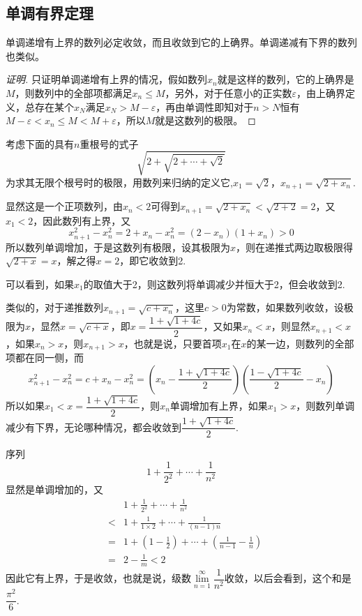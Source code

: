 \subsection{单调有界定理}
\label{sec:theorem-of-monotone-bounded}

\begin{theorem}
  单调递增有上界的数列必定收敛，而且收敛到它的上确界。单调递减有下界的数列也类似。
\end{theorem}

\begin{proof}[证明]
  只证明单调递增有上界的情况，假如数列$x_n$就是这样的数列，它的上确界是$M$，则数列中的全部项都满足$x_n \leqslant M$，另外，对于任意小的正实数$\varepsilon$，由上确界定义，总存在某个$x_N$满足$x_N>M-\varepsilon$，再由单调性即知对于$n>N$恒有$M-\varepsilon < x_n \leqslant M < M+\varepsilon$，所以$M$就是这数列的极限。
\end{proof}

\begin{example}
  考虑下面的具有$n$重根号的式子
  \[ \sqrt{2+\sqrt{2+\cdots+\sqrt{2}}} \]
  为求其无限个根号时的极限，用数列来归纳的定义它,$x_1=\sqrt{2}$，$x_{n+1}=\sqrt{2+x_n}$.

  显然这是一个正项数列，由$x_n<2$可得到$x_{n+1}=\sqrt{2+x_n}<\sqrt{2+2}=2$，又$x_1<2$，因此数列有上界，又
  \[ x_{n+1}^2-x_n^2=2+x_n-x_n^2=(2-x_n)(1+x_n)>0 \]
  所以数列单调增加，于是这数列有极限，设其极限为$x$，则在递推式两边取极限得$\sqrt{2+x}=x$，解之得$x=2$，即它收敛到2.

  可以看到，如果$x_1$的取值大于2，则这数列将单调减少并恒大于2，但会收敛到2.

  类似的，对于递推数列$x_{n+1}=\sqrt{c+x_n}$，这里$c>0$为常数，如果数列收敛，设极限为$x$，显然$x=\sqrt{c+x}$，即$x=\dfrac{1+\sqrt{1+4c}}{2}$，又如果$x_n<x$，则显然$x_{n+1}<x$，如果$x_n>x$，则$x_{n+1}>x$，也就是说，只要首项$x_1$在$x$的某一边，则数列的全部项都在同一侧，而
  \[ x_{n+1}^2-x_n^2=c+x_n-x_n^2=\left( x_n - \frac{1+\sqrt{1+4c}}{2} \right)\left( \frac{1-\sqrt{1+4c}}{2}-x_n \right) \]
  所以如果$x_1<x=\dfrac{1+\sqrt{1+4c}}{2}$，则$x_n$单调增加有上界，如果$x_1>x$，则数列单调减少有下界，无论哪种情况，都会收敛到$\dfrac{1+\sqrt{1+4c}}{2}$.
\end{example}

\begin{example}
  序列
  \[ 1+\frac{1}{2^2}+\cdots+\frac{1}{n^2} \]
  显然是单调增加的，又
  \begin{eqnarray*}
    && 1+\frac{1}{2^2}+\cdots+\frac{1}{n^2} \\
    & < & 1 + \frac{1}{1\times 2}+\cdots+\frac{1}{(n-1)n} \\
    & = & 1+\left( 1-\frac{1}{2} \right)+\cdots+\left( \frac{1}{n-1}-\frac{1}{n} \right) \\
    & = & 2-\frac{1}{m} < 2
  \end{eqnarray*}
  因此它有上界，于是收敛，也就是说，级数$\lim\limits_{n=1}^{\infty}\dfrac{1}{n^2}$收敛，以后会看到，这个和是$\dfrac{\pi^2}{6}$.
\end{example}

